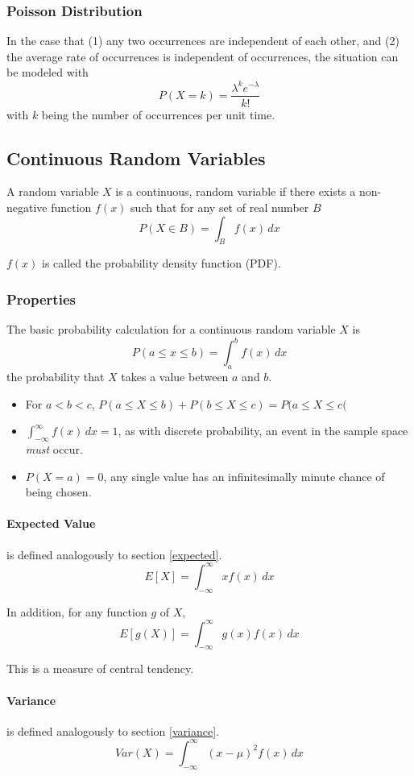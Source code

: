 \documentclass{article}
\begin{document}
\subsubsection{Poisson Distribution}
In the case that (1) any two occurrences are independent of each other, and (2) the average rate of occurrences is independent of occurrences, the situation can be modeled with
$$P(X=k)=\frac{\lambda^ke^{-\lambda}}{k!}$$
with $k$ being the number of occurrences per unit time.

\subsection{Continuous Random Variables}
A random variable $X$ is a continuous, random variable if there exists a non-negative function $f(x)$ such that for any set of real number $B$
$$P(X \in B) = \int_B f(x)\,dx$$

$f(x)$ is called the probability density function (PDF).

\subsubsection{Properties}
The basic probability calculation for a continuous random variable $X$ is
$$P(a \le x \le b)=\int_a^b f(x)\,dx$$
the probability that $X$ takes a value between $a$ and $b$.

\begin{itemize}
    \item For $a < b < c$, $P(a \le X \le b) + P(b \le X \le c) = P(a \le X \le c($
    \item $\int_{-\infty}^\infty f(x)\,dx = 1$, as with discrete probability, an event in the sample space \emph{must} occur.
    \item $P(X = a) = 0$, any single value has an infinitesimally minute chance of being chosen.
\end{itemize}

\paragraph{Expected Value} is defined analogously to section \ref{expected}.
$$E[X] = \int_{-\infty}^\infty xf(x)\,dx$$

In addition, for any function $g$ of $X$, $$E[g(X)] = \int_{-\infty}^\infty g(x)f(x)\,dx$$

This is a measure of central tendency.

\paragraph{Variance} is defined analogously to section \ref{variance}.
$$Var(X) = \int_{-\infty}^\infty \left(x-\mu\right)^2f(x)\,dx$$
\end{document}
